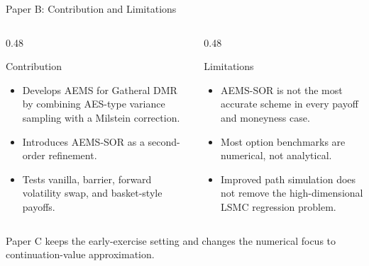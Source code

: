 \begin{frame}{Paper B: Contribution and Limitations}
  \begin{columns}[T,onlytextwidth]
    \begin{column}{0.48\textwidth}
      \begin{block}{Contribution}
        \begin{itemize}
          \item Develops AEMS for Gatheral DMR by combining AES-type variance sampling with a Milstein correction.
          \item Introduces AEMS-SOR as a second-order refinement.
          \item Tests vanilla, barrier, forward volatility swap, and basket-style payoffs.
        \end{itemize}
      \end{block}
    \end{column}
    \begin{column}{0.48\textwidth}
      \begin{block}{Limitations}
        \begin{itemize}
          \item AEMS-SOR is not the most accurate scheme in every payoff and moneyness case.
          \item Most option benchmarks are numerical, not analytical.
          \item Improved path simulation does not remove the high-dimensional LSMC regression problem.
        \end{itemize}
      \end{block}
    \end{column}
  \end{columns}

  \vspace{0.45em}
  \begin{center}
    \small Paper C keeps the early-exercise setting and changes the numerical focus to continuation-value approximation.
  \end{center}
\end{frame}
